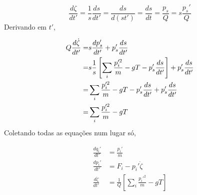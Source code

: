 \documentclass[twoside, a4paper]{article}
\newcommand{\deri}[2]{\frac{d #1}{d #2}}
\begin{document}
\begin{equation}
	\deri{\zeta}{t'} = \frac{1}{s}\deri{s}{t'} = \deri{s}{(st')} = \deri{s}{t} = \frac{p_s}{Q} = s \frac{p_s'}{Q}
\end{equation}
Derivando em $t'$,

\begin{align}
	Q \deri{\dot{\zeta}}{t'} =& s \deri{p_s'}{t'} + p_s' \deri{s}{t'} \notag \\
		=& s \frac{1}{s} \left[ \sum_i \frac{p_i'^2}{m} -gT -p_s' \deri{s}{t'}\right] + p_s' \deri{s}{t'} \notag \\
		=& \sum_i \frac{p_i'^2}{m} -gT -p_s' \deri{s}{t'} + p_s' \deri{s}{t'} \notag \\
		=& \sum_i \frac{p_i'^2}{m} - gT 
\end{align}
Coletando todas as equações num lugar só,

\begin{align}
	\deri{q_i'}{t'} &= \frac{p_i'}{m} \\
	\deri{p_i'}{t'} &= F_i - p_i' \dot{\zeta} \\
	\deri{\dot{\zeta}}{t'} &=  \frac{1}{Q} \left[\sum_i \frac{p_i'^2}{m} - gT\right] 
\end{align}
\end{document}
